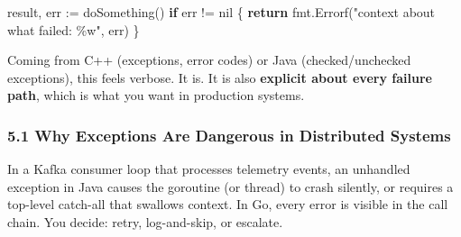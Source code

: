 \documentclass[
]{article}
\newenvironment{Shaded}{}{}
\newcommand{\ControlFlowTok}[1]{\textcolor[rgb]{0.00,0.44,0.13}{\textbf{#1}}}
\newcommand{\NormalTok}[1]{#1}
\newcommand{\OperatorTok}[1]{\textcolor[rgb]{0.40,0.40,0.40}{#1}}
\newcommand{\OtherTok}[1]{\textcolor[rgb]{0.00,0.44,0.13}{#1}}
\newcommand{\StringTok}[1]{\textcolor[rgb]{0.25,0.44,0.63}{#1}}
\begin{document}
\begin{Shaded}
\begin{Highlighting}[]
\NormalTok{result}\OperatorTok{,}\NormalTok{ err }\OperatorTok{:=}\NormalTok{ doSomething}\OperatorTok{()}
\ControlFlowTok{if}\NormalTok{ err }\OperatorTok{!=} \OtherTok{nil} \OperatorTok{\{}
    \ControlFlowTok{return}\NormalTok{ fmt}\OperatorTok{.}\NormalTok{Errorf}\OperatorTok{(}\StringTok{"context about what failed: \%w"}\OperatorTok{,}\NormalTok{ err}\OperatorTok{)}
\OperatorTok{\}}
\end{Highlighting}
\end{Shaded}

Coming from C++ (exceptions, error codes) or Java (checked/unchecked
exceptions), this feels verbose. It is. It is also \textbf{explicit
about every failure path}, which is what you want in production systems.

\hypertarget{why-exceptions-are-dangerous-in-distributed-systems}{%
\subsubsection{5.1 Why Exceptions Are Dangerous in Distributed
Systems}\label{why-exceptions-are-dangerous-in-distributed-systems}}

In a Kafka consumer loop that processes telemetry events, an unhandled
exception in Java causes the goroutine (or thread) to crash silently, or
requires a top-level catch-all that swallows context. In Go, every error
is visible in the call chain. You decide: retry, log-and-skip, or
escalate.
\end{document}
